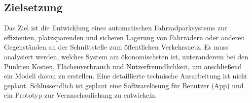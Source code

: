 \subsection{Zielsetzung}
Das Ziel ist die Entwicklung eines automatischen Fahrradparksystems zur effizienten, platzsparenden und sicheren Lagerung von Fahrrädern oder anderen Gegenständen an der Schnittstelle zum öffentlichen Verkehrsnetz. Es muss analysiert werden, welches System am ökonomischsten ist, unteranderem bei den Punkten Kosten, Flächenverbrauch und Nutzerfreundlichkeit, um anschließend ein Modell davon zu erstellen. Eine detaillierte technische Ausarbeitung ist nicht geplant. Schlussendlich ist geplant eine Softwarelösung für Benutzer (App) und ein Prototyp zur Veranschaulichung zu entwickeln.